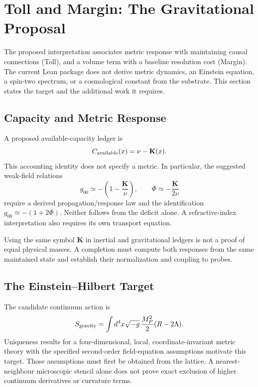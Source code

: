 \section{Toll and Margin: The Gravitational Proposal}
\label{sec:toll_margin}

The proposed interpretation associates metric response with maintaining causal connections (Toll), and a volume term with a baseline resolution cost (Margin). The current Lean package does not derive metric dynamics, an Einstein equation, a spin-two spectrum, or a cosmological constant from the substrate. This section states the target and the additional work it requires.

\subsection{Capacity and Metric Response}
A proposed available-capacity ledger is
\begin{equation}
 C_{\rm available}(x)=\nu-\mathbf K(x).
\end{equation}
This accounting identity does not specify a metric. In particular, the suggested weak-field relations
\begin{equation}
 g_{00}\simeq-\left(1-\frac{\mathbf K}{\nu}\right),\qquad
 \Phi\simeq-\frac{\mathbf K}{2\nu}
\end{equation}
require a derived propagation/response law and the identification $g_{00}\simeq-(1+2\Phi)$. Neither follows from the deficit alone. A refractive-index interpretation also requires its own transport equation.

Using the same symbol $\mathbf K$ in inertial and gravitational ledgers is not a proof of equal physical masses. A completion must compute both responses from the same maintained state and establish their normalization and coupling to probes.

\subsection{The Einstein--Hilbert Target}
The candidate continuum action is
\begin{equation}
 S_{\rm gravity}=\int d^4x\sqrt{-g}\,\frac{M_P^2}{2}(R-2\Lambda).
\end{equation}
Uniqueness results for a four-dimensional, local, coordinate-invariant metric theory with the specified second-order field-equation assumptions \cite{lovelock_einstein_1971} motivate this target. Those assumptions must first be obtained from the lattice. A nearest-neighbour microscopic stencil alone does not prove exact exclusion of higher continuum derivatives or curvature terms.

